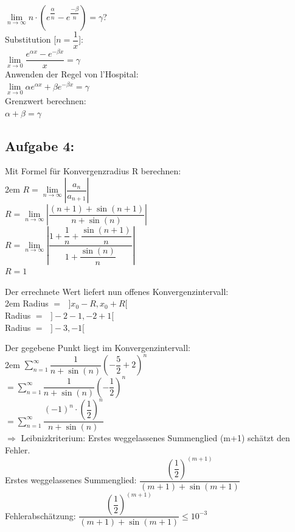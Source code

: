 \documentclass[11pt,final]{scrreprt}
\newcommand{\br} {\medskip\\}
\begin{document}
\hspace*{2em}$ \lim\limits_{n\to\infty} n\cdot\left( e^{\dfrac{\alpha}{n}}- e^{\dfrac{-\beta}{n}}\right) = \gamma $?\br
Substitution [$ n=\dfrac{1}{x} $]:\\
\hspace*{2em}$ \lim\limits_{x\to 0} \dfrac{e^{{\alpha}{x}}- e^{{-\beta}{x}}}{x} = \gamma $\br
Anwenden der Regel von l'Hospital:\\
\hspace*{2em}$ \lim\limits_{x\to 0} \alpha{e^{{\alpha}{x}}+\beta e^{{-\beta}{x}}} = \gamma $\br
Grenzwert berechnen:\\
\hspace*{2em}$ \alpha + \beta = \gamma $\br


\subsection*{Aufgabe 4:}

Mit Formel für Konvergenzradius R berechnen:\\

\begingroup
\leftskip2em 
$ R = \lim\limits_{n\to\infty} \left| \dfrac{a_n}{a_{n+1}} \right|$\br
$ R = \lim\limits_{n\to\infty} \left| \dfrac{(n+1)+\sin(n+1)}{n+\sin(n)} \right|$\br
$ R = \lim\limits_{n\to\infty} \left| \dfrac{1+\dfrac{1}{n}+\dfrac{\sin(n+1)}{n}}{1+\dfrac{\sin(n)}{n}} \right|$\\
$ R = 1$\\
\par	
\endgroup 

Der errechnete Wert liefert nun offenes Konvergenzintervall:\\

\begingroup
\leftskip2em 
Radius $=\text{ }]x_0-R, x_0+R[ $\\
Radius $=\text{ }]-2-1, -2+1[ $\\
Radius $=\text{ }]-3, -1[ $\\
\par	
\endgroup 

Der gegebene Punkt liegt im Konvergenzintervall:\\

\begingroup
\leftskip2em 
$\sum\limits_{n=1}^\infty \dfrac{1}{n+\sin(n)} (-\dfrac{5}{2}+2)^n $\br
$=\sum\limits_{n=1}^\infty \dfrac{1}{n+\sin(n)} (-\dfrac{1}{2})^n $\br
$=\sum\limits_{n=1}^\infty \dfrac{(-1)^n\cdot(\dfrac{1}{2})^n}{n+\sin(n)} $\br
$\Rightarrow $ Leibnizkriterium: Erstes weggelassenes Summenglied (m+1) schätzt den Fehler.\br
Erstes weggelassenes Summenglied: $\dfrac{(\dfrac{1}{2})^{(m+1)}}{(m+1)+\sin(m+1)} $\br
Fehlerabschätzung: $\dfrac{(\dfrac{1}{2})^{(m+1)}}{(m+1)+\sin(m+1)} \leq 10^{-3}$\\
\par	
\endgroup 
\end{document}
